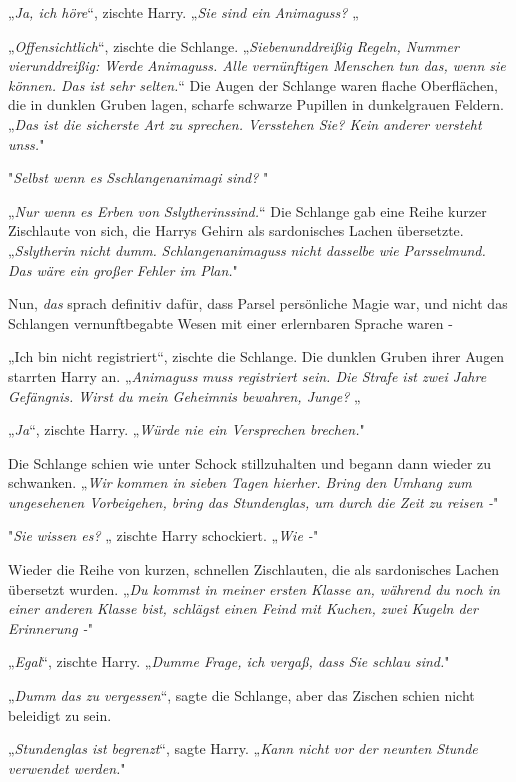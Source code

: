 {„\emph{Ja, ich höre}“, zischte Harry. „\emph{Sie sind ein} \emph{Animaguss?} „

„\emph{Offensichtlich}“, zischte die Schlange. „\emph{Siebenunddreißig Regeln, Nummer vierunddreißig: Werde} \emph{Animaguss. Alle vernünftigen Menschen tun das, wenn sie können. Das ist sehr selten.}“ Die Augen der Schlange waren flache Oberflächen, die in dunklen Gruben lagen, scharfe schwarze Pupillen in dunkelgrauen Feldern. „\emph{Das ist die sicherste Art zu sprechen. Versstehen Sie? Kein anderer versteht} \emph{unss.}"

"\emph{Selbst wenn es} \emph{Sschlangenanimagi} \emph{sind?} "

„\emph{Nur wenn es Erben von} \emph{Sslytherinssind.}“ Die Schlange gab eine Reihe kurzer Zischlaute von sich, die Harrys Gehirn als sardonisches Lachen übersetzte. „\emph{Sslytherin} \emph{nicht dumm.} \emph{Schlangenanimaguss} \emph{nicht dasselbe wie} \emph{Parsselmund. Das wäre ein großer Fehler im Plan.}"

Nun, \emph{das} sprach definitiv dafür, dass Parsel persönliche Magie war, und nicht das Schlangen vernunftbegabte Wesen mit einer erlernbaren Sprache waren -

„Ich bin nicht registriert“, zischte die Schlange. Die dunklen Gruben ihrer Augen starrten Harry an. „\emph{Animaguss} \emph{muss registriert sein. Die Strafe ist zwei Jahre Gefängnis. Wirst du mein Geheimnis bewahren, Junge?} „

„\emph{Ja}“, zischte Harry. „\emph{Würde nie ein Versprechen brechen.}"

Die Schlange schien wie unter Schock stillzuhalten und begann dann wieder zu schwanken. „\emph{Wir kommen in sieben Tagen hierher. Bring den Umhang zum ungesehenen Vorbeigehen, bring das Stundenglas, um durch die Zeit zu reisen -}"

"\emph{Sie wissen es?} „ zischte Harry schockiert. „\emph{Wie -}"

Wieder die Reihe von kurzen, schnellen Zischlauten, die als sardonisches Lachen übersetzt wurden. „\emph{Du kommst in meiner ersten Klasse an, während du noch in einer anderen Klasse bist, schlägst einen Feind mit Kuchen, zwei Kugeln der Erinnerung -}"

„\emph{Egal}“, zischte Harry. „\emph{Dumme Frage, ich vergaß, dass Sie schlau sind.}"

„\emph{Dumm das zu vergessen}“, sagte die Schlange, aber das Zischen schien nicht beleidigt zu sein.

„\emph{Stundenglas ist begrenzt}“, sagte Harry. „\emph{Kann nicht vor der neunten Stunde verwendet werden.}"

}
